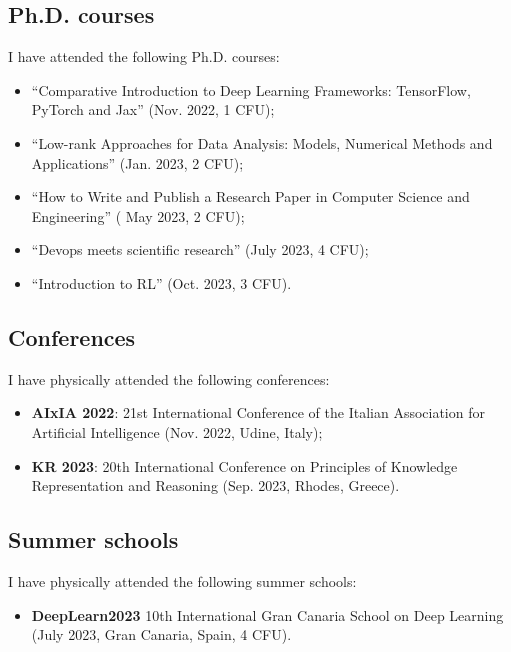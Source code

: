 \documentclass[]{scrartcl}
\begin{document}
    \subsection{Ph.D. courses}
    \label{sec:done:courses}
    I have attended the following Ph.D. courses:
    \begin{itemize}
        \item ``Comparative Introduction to Deep Learning Frameworks: TensorFlow, PyTorch and Jax'' (Nov. 2022, 1 CFU);
        \item ``Low-rank Approaches for Data Analysis: Models, Numerical Methods and Applications'' (Jan. 2023, 2 CFU);
        \item ``How to Write and Publish a Research Paper in Computer Science and Engineering'' ( May 2023, 2 CFU);
        \item ``Devops meets scientific research'' (July 2023, 4 CFU);
        \item ``Introduction to RL'' (Oct. 2023, 3 CFU).
    \end{itemize}

    \subsection{Conferences}
    \label{sec:done:conferences}
    I have physically attended the following conferences:
    \begin{itemize}
        \item \textbf{AIxIA 2022}: 21st International Conference of the Italian Association for Artificial Intelligence (Nov. 2022, Udine, Italy);
        \item \textbf{KR 2023}: 20th International Conference on Principles of Knowledge Representation and Reasoning (Sep. 2023, Rhodes, Greece).
    \end{itemize}

    \subsection{Summer schools}
    \label{sec:done:summerschools}
    I have physically attended the following summer schools:
    \begin{itemize}
        \item \textbf{DeepLearn2023} 10th International Gran Canaria School on Deep Learning (July 2023, Gran Canaria, Spain, 4 CFU).
    \end{itemize}
\end{document}
